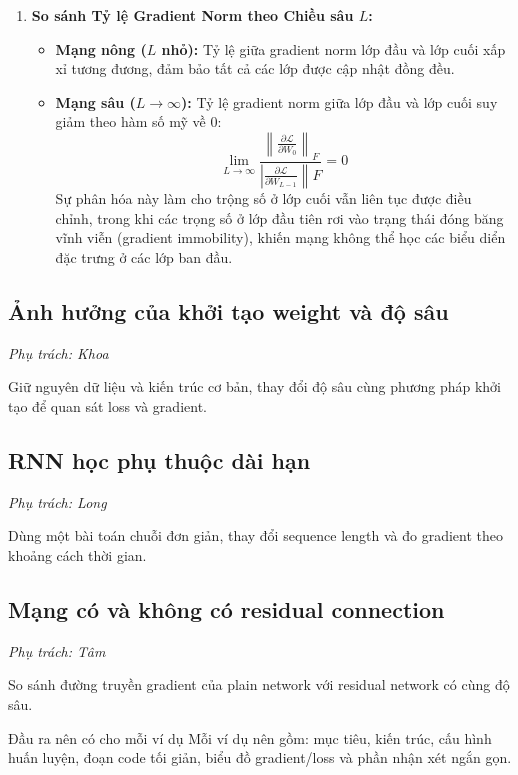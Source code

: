 \documentclass[12pt]{article}
\begin{document}
\begin{enumerate}
    \item \textbf{So sánh Tỷ lệ Gradient Norm theo Chiều sâu $L$:}
    \begin{itemize}
        \item \textbf{Mạng nông ($L$ nhỏ):} Tỷ lệ giữa gradient norm lớp đầu và lớp cuối xấp xỉ tương đương, đảm bảo tất cả các lớp được cập nhật đồng đều.
        \item \textbf{Mạng sâu ($L \to \infty$):} Tỷ lệ gradient norm giữa lớp đầu và lớp cuối suy giảm theo hàm số mỹ về $0$:
        \begin{equation}
            \lim_{L \to \infty} \frac{\left\| \frac{\partial \mathcal{L}}{\partial W_0} \right \|_F}{\left | \frac{\partial \mathcal{L}}{\partial W_{L-1}} \right\|F} = 0
        \end{equation}
        Sự phân hóa này làm cho trộng số ở lớp cuối vẫn liên tục được điều chỉnh, trong khi các trọng số ở lớp đầu tiên rơi vào trạng thái đóng băng vĩnh viễn (gradient immobility), khiến mạng không thể học các biểu diển đặc trưng ở các lớp ban đầu.
    \end{itemize}
\end{enumerate}

\subsection{Ảnh hưởng của khởi tạo weight và độ sâu}
\textit{Phụ trách: Khoa}

Giữ nguyên dữ liệu và kiến trúc cơ bản, thay đổi độ sâu cùng phương pháp khởi tạo để quan sát loss và gradient.

\subsection{RNN học phụ thuộc dài hạn}
\textit{Phụ trách: Long}

Dùng một bài toán chuỗi đơn giản, thay đổi sequence length và đo gradient theo khoảng cách thời gian.

\subsection{Mạng có và không có residual connection}
\textit{Phụ trách: Tâm}

So sánh đường truyền gradient của plain network với residual network có cùng độ sâu.

\begin{examplebox}{Đầu ra nên có cho mỗi ví dụ}
Mỗi ví dụ nên gồm: mục tiêu, kiến trúc, cấu hình huấn luyện, đoạn code tối giản, biểu đồ gradient/loss và phần nhận xét ngắn gọn.
\end{examplebox}
\end{document}
